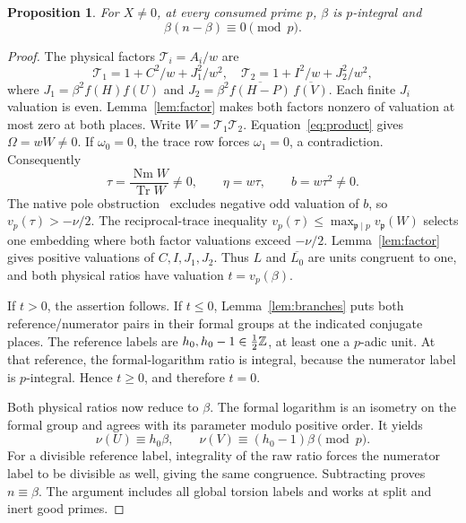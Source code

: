 \documentclass[11pt,a4paper]{article}
\newtheorem{proposition}[theorem]{Proposition}
\DeclareMathOperator{\Tr}{Tr}\DeclareMathOperator{\Nm}{Nm}
\begin{document}
\begin{proposition}\label{prop:local}
For $X\ne0$, at every consumed prime $p$, $\beta$ is $p$-integral and
\[
                         \beta(n-\beta)\equiv0\pmod p.
\]
\end{proposition}
\begin{proof}
The physical factors $\mathcal T_i=A_i/w$ are
\[
 \mathcal T_1=1+C^2/w+J_1^2/w^2,\quad
 \mathcal T_2=1+I^2/w+J_2^2/w^2,
\]
where $J_1=\beta^2f(H)f(U)$ and
$J_2=\beta^2\overline{f(H-P)}\,\overline{f(V)}$.
Each finite $J_i$ valuation is even. Lemma~\ref{lem:factor}
makes both factors nonzero of valuation at most zero at both places.
Write $W=\mathcal T_1\mathcal T_2$.
Equation~\eqref{eq:product} gives $\Omega=wW\ne0$.
If $\omega_0=0$, the trace row forces $\omega_1=0$, a contradiction.
Consequently
\begin{equation}\label{eq:physical}
 \tau=\frac{\Nm W}{\Tr W}\ne0,\qquad
 \eta=w\tau,\qquad b=w\tau^2\ne0.
\end{equation}
The native pole obstruction~\cite{Pole} excludes negative odd
valuation of $b$, so $v_p(\tau)>-\nu/2$.
The reciprocal-trace inequality
$v_p(\tau)\le\max_{\mathfrak p\mid p}v_{\mathfrak p}(W)$
selects one embedding where both factor valuations exceed $-\nu/2$.
Lemma~\ref{lem:factor} gives positive valuations of $C,I,J_1,J_2$.
Thus $L$ and $\overline{L_0}$ are units congruent to one, and both
physical ratios have valuation $t=v_p(\beta)$.

If $t>0$, the assertion follows. If $t\le0$,
Lemma~\ref{lem:branches} puts both reference/numerator pairs in their
formal groups at the indicated conjugate places. The reference labels
are $h_0,h_0-1\in\tfrac12\mathbb Z$, at least one a $p$-adic unit.
At that reference, the formal-logarithm ratio is integral, because
the numerator label is $p$-integral. Hence $t\ge0$, and therefore
$t=0$.

Both physical ratios now reduce to $\beta$. The formal logarithm
is an isometry on the formal group and agrees with its parameter
modulo positive order. It yields
\[
 \nu(U)\equiv h_0\beta,\qquad
 \nu(V)\equiv(h_0-1)\beta\pmod p.
\]
For a divisible reference label, integrality of the raw ratio forces
the numerator label to be divisible as well, giving the same congruence.
Subtracting proves $n\equiv\beta$. The argument includes all global
torsion labels and works at split and inert good primes.
\end{proof}
\end{document}

